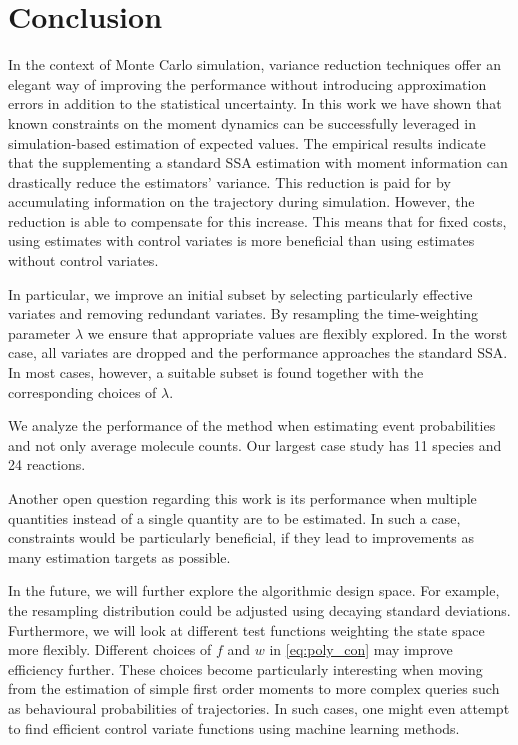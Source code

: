 \section{Conclusion}\label{sec:cv:conclusion}
In the context of Monte Carlo simulation, variance reduction
techniques offer an elegant way of improving the performance without
introducing approximation errors in addition to the statistical uncertainty.
In this work we have shown that known constraints on the moment dynamics can be successfully
leveraged in simulation-based estimation of expected values.
The empirical results indicate that
the supplementing a standard \ac{SSA} estimation with moment information
can drastically reduce the estimators' variance.
This reduction is paid for by accumulating information on the trajectory
during simulation.
However, the reduction is able to compensate for this increase.
This means that for fixed costs, using   estimates with
  control variates is more beneficial than using estimates without control variates.


In particular, we improve an initial subset by selecting particularly effective variates and removing redundant variates.
By resampling the time-weighting parameter $\lambda$ we ensure that appropriate values  are
flexibly explored.
In the worst case, all variates are dropped and the performance approaches the standard \ac{SSA}.
In most cases, however, a suitable subset is found together with the corresponding choices of $\lambda$.

We  analyze the performance of the method when estimating event probabilities and not only average molecule counts. Our largest case study has \num{11} species and
\num{24} reactions. %

Another open question regarding this work is its performance when multiple
quantities instead of a single quantity are to be estimated. In such
a case, constraints would be particularly beneficial, if they lead
to improvements  as many estimation targets as possible.


In the future, we will further explore the algorithmic design space.
For example, the resampling distribution could be adjusted using decaying standard deviations.
Furthermore, we will look at different test functions weighting the state space more flexibly.
Different choices of $f$ and $w$ in \eqref{eq:poly_con} may improve 
efficiency further.
These choices become particularly interesting when moving from the estimation
of simple first order moments to more complex queries such as behavioural probabilities
of trajectories.
In such cases, one might even attempt to find efficient control variate functions
using machine learning methods.

